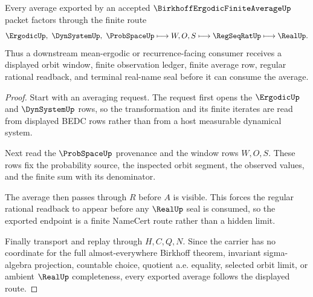 \begin{theorem}
\label{thm:birkhoff-ergodic-finite-average-readback-route}
Every average exported by an accepted $\BirkhoffErgodicFiniteAverageUp$ packet factors through the finite route
$$
\ErgodicUp,\ \DynSystemUp,\ \ProbSpaceUp \longmapsto W,O,S \longmapsto \RegSeqRatUp \longmapsto \RealUp .
$$
Thus a downstream mean-ergodic or recurrence-facing consumer receives a displayed orbit window, finite observation ledger, finite average row, regular rational readback, and terminal real-name seal before it can consume the average.
\end{theorem}
\begin{proof}
Start with an averaging request. The request first opens the $\ErgodicUp$ and $\DynSystemUp$ rows, so the transformation and its finite iterates are read from displayed BEDC rows rather than from a host measurable dynamical system.

Next read the $\ProbSpaceUp$ provenance and the window rows $W,O,S$. These rows fix the probability source, the inspected orbit segment, the observed values, and the finite sum with its denominator.

The average then passes through $R$ before $A$ is visible. This forces the regular rational readback to appear before any $\RealUp$ seal is consumed, so the exported endpoint is a finite NameCert route rather than a hidden limit.

Finally transport and replay through $H,C,Q,N$. Since the carrier has no coordinate for the full almost-everywhere Birkhoff theorem, invariant sigma-algebra projection, countable choice, quotient a.e. equality, selected orbit limit, or ambient $\RealUp$ completeness, every exported average follows the displayed route.
\end{proof}



